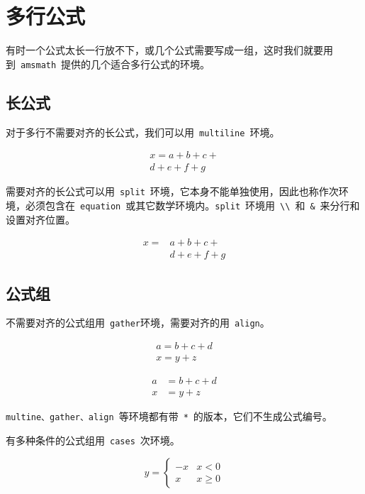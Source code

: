 \section{多行公式}
有时一个公式太长一行放不下，或几个公式需要写成一组，这时我们就要用到~\verb|amsmath|~提供的几个适合多行公式的环境。

\subsection{长公式}
对于多行不需要对齐的长公式，我们可以用~\verb|multiline|~环境。
\begin{demo}
\begin{multline}
x=a+b+c+\\
d+e+f+g
\end{multline}
\end{demo}

需要对齐的长公式可以用~\verb|split|~环境，它本身不能单独使用，因此也称作次环境，必须包含在~\verb|equation|~或其它数学环境内。\verb|split|~环境用~\verb|\\|~和~\verb|&|~来分行和设置对齐位置。
\begin{demo}
\[ \begin{split}
x=&a+b+c+\\
  &d+e+f+g
\end{split} \]
\end{demo}

\subsection{公式组}
不需要对齐的公式组用~\verb|gather|环境，需要对齐的用~\verb|align|。
\begin{demo}
\begin{gather}
a=b+c+d\\
x=y+z
\end{gather}
\end{demo}

\begin{demo}
\begin{align}
a&=b+c+d\\
x&=y+z
\end{align}
\end{demo}

\verb|multine、gather、align|~等环境都有带~\verb|*|~的版本，它们不生成公式编号。

有多种条件的公式组用~\verb|cases|~次环境。
\begin{demo}
\[ y=\begin{cases}
-x & x<0\\
x & x\geq0
\end{cases} \]
\end{demo}

